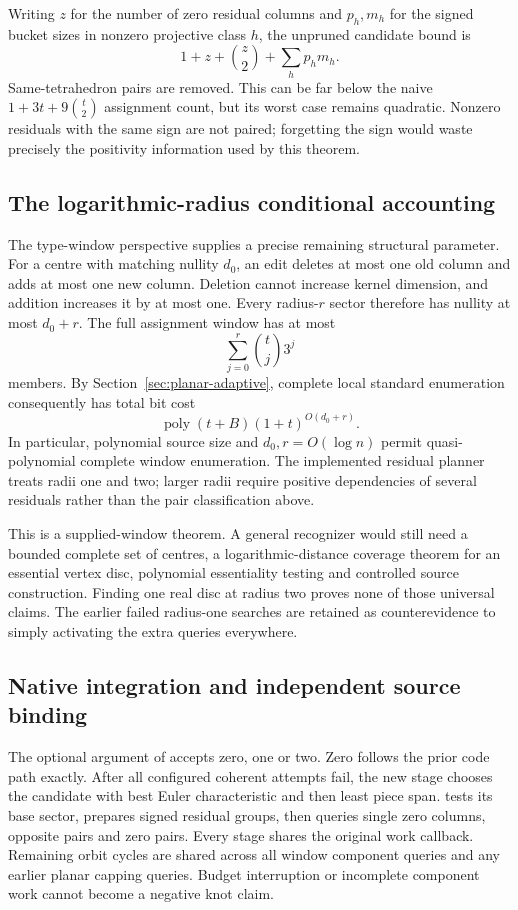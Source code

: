 Writing $z$ for the number of zero residual columns and $p_h,m_h$ for
the signed bucket sizes in nonzero projective class $h$, the unpruned
candidate bound is
\[
                 1+z+\binom z2+\sum_h p_hm_h.
\]
Same-tetrahedron pairs are removed. This can be far below the naive
$1+3t+9\binom t2$ assignment count, but its worst case remains quadratic.
Nonzero residuals with the same sign are not paired; forgetting the sign
would waste precisely the positivity information used by this theorem.

\subsection{The logarithmic-radius conditional accounting}

The type-window perspective supplies a precise remaining structural
parameter. For a centre with matching nullity $d_0$, an edit deletes at
most one old column and adds at most one new column. Deletion cannot
increase kernel dimension, and addition increases it by at most one.
Every radius-$r$ sector therefore has nullity at most $d_0+r$.
The full assignment window has at most
\[
                   \sum_{j=0}^{r}\binom tj3^j
\]
members. By Section~\ref{sec:planar-adaptive}, complete local standard
enumeration consequently has total bit cost
\[
 \operatorname{poly}(t+B)(1+t)^{O(d_0+r)}.
\]
In particular, polynomial source size and $d_0,r=O(\log n)$ permit
quasi-polynomial complete window enumeration. The implemented residual
planner treats radii one and two; larger radii require positive dependencies
of several residuals rather than the pair classification above.

This is a supplied-window theorem. A general recognizer would still need
a bounded complete set of centres, a logarithmic-distance coverage theorem
for an essential vertex disc, polynomial essentiality testing and controlled
source construction. Finding one real disc at radius two proves none of
those universal claims. The earlier failed radius-one searches are retained
as counterevidence to simply activating the extra queries everywhere.

\subsection{Native integration and independent source binding}

\begin{sloppypar}
The optional  argument of 
accepts zero, one or two. Zero follows the prior code path exactly.
After all configured coherent attempts fail, the new stage chooses the
candidate with best Euler characteristic and then least piece span.
 tests its base sector, prepares signed residual
groups, then queries single zero columns, opposite pairs and zero pairs.
Every stage shares the original work callback. Remaining orbit cycles
are shared across all window component queries and any earlier planar
capping queries. Budget interruption or incomplete component work cannot
become a negative knot claim.
\end{sloppypar}

